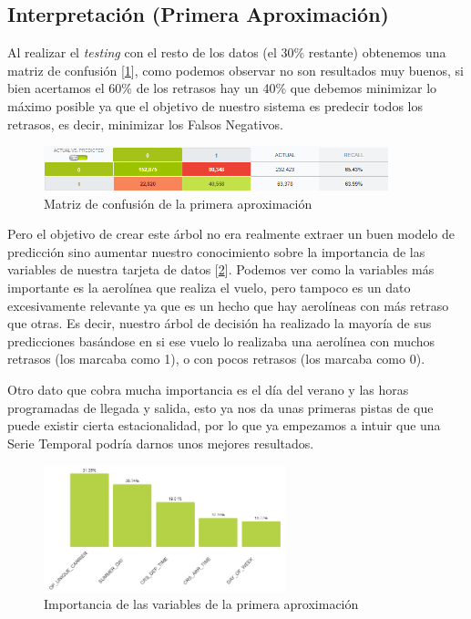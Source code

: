 \documentclass[format=acmsmall, review=false, screen=true]{acmart}
\begin{document}
\subsection{Interpretación (Primera Aproximación)}

Al realizar el \emph{testing} con el resto de los datos (el 30\% restante) obtenemos una matriz de confusión [\ref{fig:ConfMatrixAprox1}], como podemos observar no son resultados muy buenos, si bien acertamos el 60\% de los retrasos hay un 40\% que debemos minimizar lo máximo posible ya que el objetivo de nuestro sistema es predecir todos los retrasos, es decir, minimizar los Falsos Negativos. 

\begin{figure}[htb]
	\centering
	\includegraphics[width=10cm]{ConfMatrixAprox1.png}
	\caption{Matriz de confusión de la primera aproximación}
	\label{fig:ConfMatrixAprox1}
\end{figure}

Pero el objetivo de crear este árbol no era realmente extraer un buen modelo de predicción sino aumentar nuestro conocimiento sobre la importancia de las variables de nuestra tarjeta de datos [\ref{fig:ImportanciaAprox1}]. Podemos ver como la variables más importante es la aerolínea que realiza el vuelo, pero tampoco es un dato excesivamente relevante ya que es un hecho que hay aerolíneas con más retraso que otras. Es decir, nuestro árbol de decisión ha realizado la mayoría de sus predicciones basándose en si ese vuelo lo realizaba una aerolínea con muchos retrasos (los marcaba como 1), o con pocos retrasos (los marcaba como 0).

Otro dato que cobra mucha importancia es el día del verano y las horas programadas de llegada y salida, esto ya nos da unas primeras pistas de que puede existir cierta estacionalidad, por lo que ya empezamos a intuir que una Serie Temporal podría darnos unos mejores resultados.

\begin{figure}[htb]
	\centering
	\includegraphics[width=7cm]{ImportanciaAprox1.png}
	\caption{Importancia de las variables de la primera aproximación}
	\label{fig:ImportanciaAprox1}
\end{figure}
\end{document}
